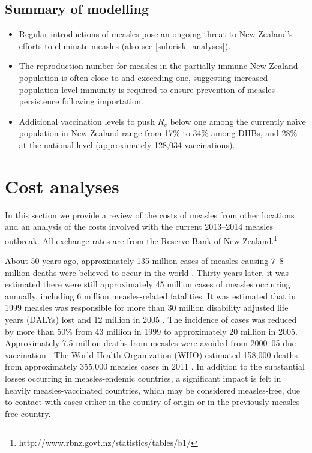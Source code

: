 \documentclass{article}
\begin{document}
\subsection{Summary of modelling}
\begin{itemize}
\item Regular introductions of measles pose an ongoing threat to New Zealand's efforts to eliminate measles (also see \autoref{sub:risk_analyses}).
\item The reproduction number for measles in the partially immune New Zealand population is often close to and exceeding one, suggesting increased population level immunity is required to ensure prevention of measles persistence following importation.
 \item Additional vaccination levels to push $R_v$ below one among the currently na\"{\i}ve population in New Zealand range from 17\% to 34\% among DHBs, and 28\% at the national level (approximately 128,034 vaccinations).
\end{itemize}

\section{Cost analyses}
\label{sec:cb}

In this section we provide a review of the costs of measles from other locations and an analysis of the costs involved with the current 2013--2014 measles outbreak. All exchange rates are from the Reserve Bank of New Zealand.\footnote{http://www.rbnz.govt.nz/statistics/tables/b1/}

About 50 years ago, approximately 135 million cases of measles causing 7--8 million deaths were believed to occur in the world \citep{clements4}. Thirty years later, it was estimated there were still approximately 45 million cases of measles occurring annually, including 6 million measles-related fatalities. It was estimated that in 1999 measles was responsible for more than 30 million disability adjusted life years (DALYs) lost and 12 million in 2005 \citep{wolfson7}. The incidence of cases was reduced by more than 50\% from 43 million in 1999 to approximately 20 million in 2005. Approximately 7.5 million deaths from measles were avoided from 2000--05 due vaccination \citep{wolfson7}. The World Health Organization (WHO) estimated 158,000 deaths from approximately 355,000 measles cases in 2011 \citep{who13}.  In addition to the substantial losses occurring in measles-endemic countries, a significant impact is felt in heavily measles-vaccinated countries, which may be considered measles-free, due to contact with cases either in the country of origin or in the previously measles-free country.
\end{document}
